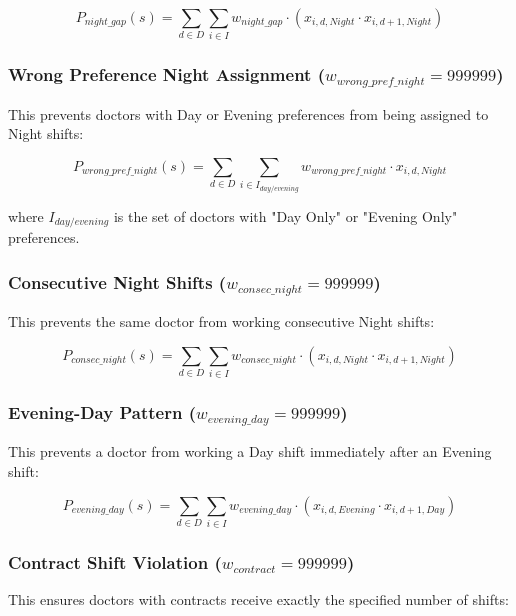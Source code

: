 \documentclass[12pt]{article}
\begin{document}
\begin{equation}
P_{night\_gap}(s) = \sum_{d \in D} \sum_{i \in I} w_{night\_gap} \cdot (x_{i,d,Night} \cdot x_{i,d+1,Night})
\end{equation}

\subsubsection{Wrong Preference Night Assignment ($w_{wrong\_pref\_night} = 999999$)}
This prevents doctors with Day or Evening preferences from being assigned to Night shifts:

\begin{equation}
P_{wrong\_pref\_night}(s) = \sum_{d \in D} \sum_{i \in I_{day/evening}} w_{wrong\_pref\_night} \cdot x_{i,d,Night}
\end{equation}

where $I_{day/evening}$ is the set of doctors with "Day Only" or "Evening Only" preferences.

\subsubsection{Consecutive Night Shifts ($w_{consec\_night} = 999999$)}
This prevents the same doctor from working consecutive Night shifts:

\begin{equation}
P_{consec\_night}(s) = \sum_{d \in D} \sum_{i \in I} w_{consec\_night} \cdot (x_{i,d,Night} \cdot x_{i,d+1,Night})
\end{equation}

\subsubsection{Evening-Day Pattern ($w_{evening\_day} = 999999$)}
This prevents a doctor from working a Day shift immediately after an Evening shift:

\begin{equation}
P_{evening\_day}(s) = \sum_{d \in D} \sum_{i \in I} w_{evening\_day} \cdot (x_{i,d,Evening} \cdot x_{i,d+1,Day})
\end{equation}

\subsubsection{Contract Shift Violation ($w_{contract} = 999999$)}
This ensures doctors with contracts receive exactly the specified number of shifts:
\end{document}
